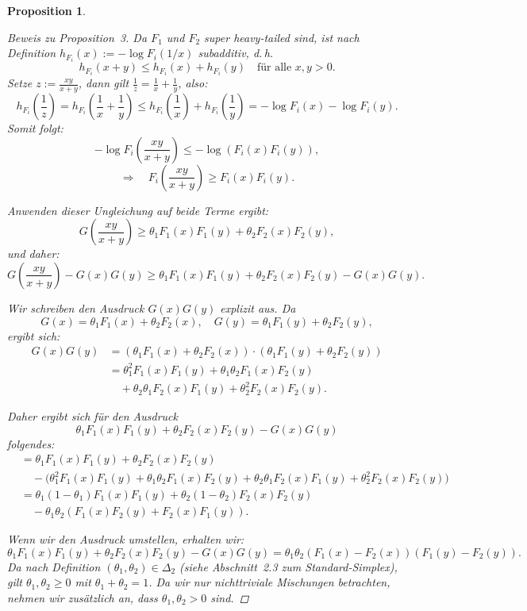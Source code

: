 \documentclass[
12pt,
fancyheadings, %
%
a4paper, 
%
]{tuhhreprt}
\newtheorem{proposition}[definition]{Proposition}
\begin{document}
\begin{proposition}
\begin{proof}[Beweis zu Proposition~3]
Da \( F_1 \) und \( F_2 \) super heavy-tailed sind, ist nach Definition \( h_{F_i}(x) := -\log F_i(1/x) \) subadditiv, d.\,h.
\[
h_{F_i}(x + y) \leq h_{F_i}(x) + h_{F_i}(y) \quad \text{für alle } x, y > 0.
\]
Setze \( z := \frac{xy}{x + y} \), dann gilt \( \frac{1}{z} = \frac{1}{x} + \frac{1}{y} \), also:
\[
h_{F_i}\left( \frac{1}{z} \right)
= h_{F_i}\left( \frac{1}{x} + \frac{1}{y} \right)
\leq h_{F_i}\left( \frac{1}{x} \right) + h_{F_i}\left( \frac{1}{y} \right)
= -\log F_i(x) - \log F_i(y).
\]
Somit folgt:
\[
-\log F_i\left( \frac{xy}{x + y} \right) \leq -\log(F_i(x) F_i(y)),
\]
\[
\Rightarrow \quad F_i\left( \frac{xy}{x + y} \right) \geq F_i(x) F_i(y).
\]

Anwenden dieser Ungleichung auf beide Terme ergibt:
\[
G\left( \frac{xy}{x + y} \right) \geq \theta_1 F_1(x) F_1(y) + \theta_2 F_2(x) F_2(y),
\]
und daher:
\[
G\left( \frac{xy}{x + y} \right) - G(x) G(y)
\geq \theta_1 F_1(x) F_1(y) + \theta_2 F_2(x) F_2(y) - G(x) G(y).
\]

Wir schreiben den Ausdruck \( G(x)G(y) \) explizit aus. Da
\[
G(x) = \theta_1 F_1(x) + \theta_2 F_2(x), \quad
G(y) = \theta_1 F_1(y) + \theta_2 F_2(y),
\]
ergibt sich:
\begin{align*}
G(x)G(y)
&= (\theta_1 F_1(x) + \theta_2 F_2(x)) \cdot (\theta_1 F_1(y) + \theta_2 F_2(y)) \\
&= \theta_1^2 F_1(x) F_1(y) + \theta_1 \theta_2 F_1(x) F_2(y) \\
&\quad + \theta_2 \theta_1 F_2(x) F_1(y) + \theta_2^2 F_2(x) F_2(y).
\end{align*}

Daher ergibt sich für den Ausdruck
\[
\theta_1 F_1(x) F_1(y) + \theta_2 F_2(x) F_2(y) - G(x)G(y)
\]
folgendes:
\begin{align*}
&= \theta_1 F_1(x) F_1(y) + \theta_2 F_2(x) F_2(y) \\
&\quad - \big( \theta_1^2 F_1(x) F_1(y) + \theta_1 \theta_2 F_1(x) F_2(y) + \theta_2 \theta_1 F_2(x) F_1(y) + \theta_2^2 F_2(x) F_2(y) \big) \\
&= \theta_1(1 - \theta_1) F_1(x) F_1(y) + \theta_2(1 - \theta_2) F_2(x) F_2(y) \\
&\quad - \theta_1 \theta_2 \left( F_1(x) F_2(y) + F_2(x) F_1(y) \right).
\end{align*}

Wenn wir den Ausdruck umstellen, erhalten wir:
\[
\theta_1 F_1(x) F_1(y) + \theta_2 F_2(x) F_2(y) - G(x)G(y)
= \theta_1 \theta_2 (F_1(x) - F_2(x))(F_1(y) - F_2(y)).
\]
Da nach Definition \( (\theta_1, \theta_2) \in \Delta_2 \) (siehe Abschnitt~2.3 zum Standard-Simplex), gilt \( \theta_1, \theta_2 \geq 0 \) mit \( \theta_1 + \theta_2 = 1 \).  
Da wir nur nichttriviale Mischungen betrachten, nehmen wir zusätzlich an, dass \( \theta_1, \theta_2 > 0 \) sind.


\end{proof}
\end{proposition}
\end{document}

